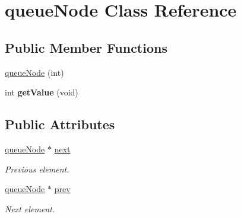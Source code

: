 \hypertarget{classqueue_node}{\section{queue\-Node Class Reference}
\label{classqueue_node}
}
\subsection*{Public Member Functions}
\begin{DoxyCompactItemize}
\item 
\hyperlink{classqueue_node_a0dd3feee9820fdfe19096fe82e18cf70}{queue\-Node} (int)
\item 
\hypertarget{classqueue_node_ab9e422af0bd18f3fe9babb2b733e7855}{int {\bfseries get\-Value} (void)}\label{classqueue_node_ab9e422af0bd18f3fe9babb2b733e7855}

\end{DoxyCompactItemize}
\subsection*{Public Attributes}
\begin{DoxyCompactItemize}
\item 
\hypertarget{classqueue_node_a932df65847855e07b726678b64116799}{\hyperlink{classqueue_node}{queue\-Node} $\ast$ \hyperlink{classqueue_node_a932df65847855e07b726678b64116799}{next}}\label{classqueue_node_a932df65847855e07b726678b64116799}

\begin{DoxyCompactList}\small\item\em Previous element. \end{DoxyCompactList}\item 
\hypertarget{classqueue_node_a1450a75fe6f27f19cba9f0d7636f48b2}{\hyperlink{classqueue_node}{queue\-Node} $\ast$ \hyperlink{classqueue_node_a1450a75fe6f27f19cba9f0d7636f48b2}{prev}}\label{classqueue_node_a1450a75fe6f27f19cba9f0d7636f48b2}

\begin{DoxyCompactList}\small\item\em Next element. \end{DoxyCompactList}\end{DoxyCompactItemize}


